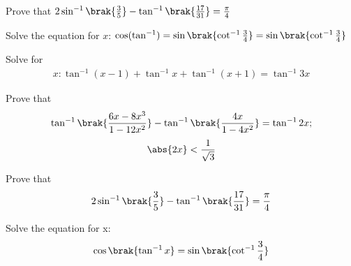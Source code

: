 	\item Prove that $ 2\sin^{-1} \brak{\frac{3}{5}} - \tan^{-1} \brak{\frac{17}{31}} = \frac{\pi}{4}$

	\hfill{}\item Solve the equation for $x$: $\cos (\tan^{-1}) = \sin \brak{\cot^{-1} \frac{3}{4}} = \sin \brak{\cot^{-1} \frac{3}{4}}$

	
	\hfill{}\item Solve for 
	\begin{align*}
		x: \tan^{-1}(x-1) + \tan^{-1}x + \tan^{-1}(x+1) = \tan^{-1}3x
	\end{align*}

	\hfill{}\item Prove that 
	\begin{align*}
	\tan^{-1} \brak{\frac{6x-8x^{3}}{1-12x^{2}}} - \tan^{-1} \brak{\frac{4x}{1-4x^{2}}} = \tan^{-1}2x;
	\end{align*}
	\begin{align*}
		\abs{2x} < \frac{1}{\sqrt{3}}
	\end{align*}

 	\hfill{}\item Prove that 
	\begin{align*}
		2\sin^{-1}\brak{\frac{3}{5}}-\tan^{-1}\brak{\frac{17}{31}} = \frac{\pi}{4}
	\end{align*}
	\hfill{}\item Solve the equation for x:
	\begin{align*}
	\cos\brak{\tan^{-1}x} = \sin\brak{\cot^{-1}\frac{3}{4}}
	\end{align*}
\hfill{}
